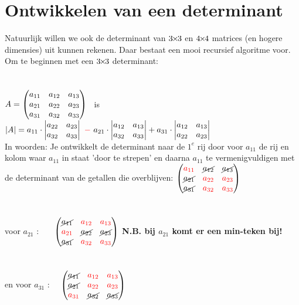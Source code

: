 \section{Ontwikkelen van een determinant}
Natuurlijk willen we ook de determinant van $3{\mkern-2mu\times\mkern-2mu}3$ en $4{\mkern-2mu\times\mkern-2mu}4$ matrices (en hogere dimensies) uit kunnen rekenen. Daar bestaat een mooi recursief algoritme voor. Om te beginnen met een $3{\mkern-2mu\times\mkern-2mu}3$ determinant:\\ \\ \\
{ $  A  = \begin{pmatrix}  a_{11} & a_{12} & a_{13}  \\  a_{21} & a_{22} & a_{23}  \\  a_{31} & a_{32}& a_{33}  \end{pmatrix}  $
	\  is \ $ |A|  = a_{11} \cdot \begin{vmatrix} a_{22} & a_{23} \\ a_{32}& a_{33}  \end{vmatrix} 
	\  {\color{red}-} \ a_{21} \cdot    \begin{vmatrix} a_{12} & a_{13} \\ a_{32}& a_{33}  \end{vmatrix} +a_{31} 
    \cdot    \begin{vmatrix} a_{12} & a_{13} \\  a_{22} & a_{23}  \end{vmatrix}  $ } \\
In woorden: Je ontwikkelt de determinant naar de $ 1^{e} $ rij door voor $  a_{11} $ de rij en kolom waar $  a_{11} $ in staat 'door te strepen' en daarna $  a_{11}  $ te vermenigvuldigen met de determinant van de getallen die overblijven:
$  \begin{pmatrix}   {\color{red}a_{11}} & \cancel{a_{12}} & \cancel{a_{13} }  \\  \cancel{a_{21}} & {\color{red}a_{22}} & {\color{red}a_{23}}  \\  \cancel{a_{31}} & {\color{red}a_{32}} & {\color{red}a_{33}}  \end{pmatrix}  $ \\ \\ \\
voor  $  a_{21}  $ :
\qquad \ \ \ $  \begin{pmatrix}  \cancel{ a_{11}} & {\color{red}a_{12}} & {\color{red}a_{13 }}  \\ {\color{red}a_{21}} & \cancel{a_{22}} & \cancel{a_{23}}  \\  \cancel{a_{31}} & {\color{red}a_{32}}  & {\color{red}a_{33} } \end{pmatrix}   $
\quad \textbf{N.B. bij $  a_{21}  $ komt er een min-teken bij!}\\ \\ \\
en voor   $  a_{31} $  :
\quad \ \ $   \begin{pmatrix}  \cancel{ a_{11}} & {\color{red}a_{12}} & {\color{red}a_{13}}   \\  \cancel{a_{21}} & {\color{red}a_{22}} & {\color{red}a_{23}}  \\  {\color{red}a_{31}} & \cancel{a_{32}} & \cancel{a_{33} }  \end{pmatrix}  $
\\ \\ \\ \\


